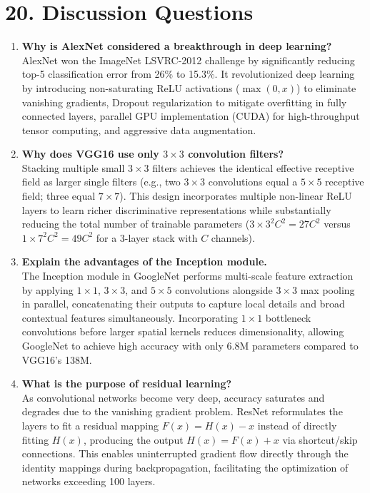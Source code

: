 \documentclass[11pt]{article}
\begin{document}

\section*{20. Discussion Questions}

\begin{enumerate}
    \item \textbf{Why is AlexNet considered a breakthrough in deep learning?} \\
    AlexNet won the ImageNet LSVRC-2012 challenge by significantly reducing top-5 classification error from 26\% to 15.3\%. It revolutionized deep learning by introducing non-saturating ReLU activations ($\max(0, x)$) to eliminate vanishing gradients, Dropout regularization to mitigate overfitting in fully connected layers, parallel GPU implementation (CUDA) for high-throughput tensor computing, and aggressive data augmentation.

    \item \textbf{Why does VGG16 use only $3\times3$ convolution filters?} \\
    Stacking multiple small $3\times3$ filters achieves the identical effective receptive field as larger single filters (e.g., two $3\times3$ convolutions equal a $5\times5$ receptive field; three equal $7\times7$). This design incorporates multiple non-linear ReLU layers to learn richer discriminative representations while substantially reducing the total number of trainable parameters ($3 \times 3^2 C^2 = 27C^2$ versus $1 \times 7^2 C^2 = 49C^2$ for a 3-layer stack with $C$ channels).

    \item \textbf{Explain the advantages of the Inception module.} \\
    The Inception module in GoogleNet performs multi-scale feature extraction by applying $1\times1$, $3\times3$, and $5\times5$ convolutions alongside $3\times3$ max pooling in parallel, concatenating their outputs to capture local details and broad contextual features simultaneously. Incorporating $1\times1$ bottleneck convolutions before larger spatial kernels reduces dimensionality, allowing GoogleNet to achieve high accuracy with only 6.8M parameters compared to VGG16's 138M.

    \item \textbf{What is the purpose of residual learning?} \\
    As convolutional networks become very deep, accuracy saturates and degrades due to the vanishing gradient problem. ResNet reformulates the layers to fit a residual mapping $F(x) = H(x) - x$ instead of directly fitting $H(x)$, producing the output $H(x) = F(x) + x$ via shortcut/skip connections. This enables uninterrupted gradient flow directly through the identity mappings during backpropagation, facilitating the optimization of networks exceeding 100 layers.


\end{enumerate}
\end{document}
